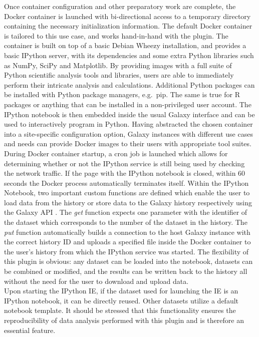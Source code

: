 \documentclass{bioinfo}
\begin{document}
\begin{methods}
Once container configuration and other preparatory work are complete, the Docker container is launched with bi-directional
access to a temporary directory containing the necessary initialization information. The default Docker container is
tailored to this use case, and works hand-in-hand with the plugin. The container is built on top of a basic Debian Wheezy installation,
and provides a basic IPython server, with its dependencies and some extra Python libraries such as NumPy, SciPy and Matplotlib.
By providing images with a full suite of Python scientific analysis tools and libraries, users are able 
to immediately perform their intricate analysis and calculations. Additional Python packages can be installed with Python
package managers, e.g.\ pip. The same is true for R packages or anything that can be installed in a non-privileged user account. 
The IPython notebook is then embedded inside the usual Galaxy interface and can be used to interactively program in Python.
Having abstracted the chosen container into a site-specific configuration option, Galaxy instances with different use cases
and needs can provide Docker images to their users with appropriate tool suites.\\
During Docker container startup, a cron job is launched which allows for determining whether or not the IPython service
is still being used by checking the network traffic. If the page with the IPython notebook is closed, within 60 seconds the
Docker process automatically terminates itself. Within the IPython Notebook, two important custom functions are defined which enable the
user to load data from the history or store data to the Galaxy history respectively using the Galaxy API \citep{Sloggett2013}.
The \textit{get} function expects one parameter with the identifier of the dataset which corresponds to the number
of the dataset in the history. The \textit{put} function automatically builds a connection to the host
Galaxy instance with the correct history ID and uploads a specified file inside the Docker container to the user's
history from which the IPython service was started. The flexibility of this plugin is obvious: any dataset can be
loaded into the notebook, datasets can be combined or modified, and the results can be written back to the history
all without the need for the user to download and upload data. \\
Upon starting the IPython IE, if the dataset used for launching the IE is an IPython
notebook, it can be directly reused. Other datasets utilize a default notebook template. It should be stressed that
this functionality ensures the reproducibility of data analysis performed with this plugin and is therefore an essential
feature.



\end{methods}
\end{document}

